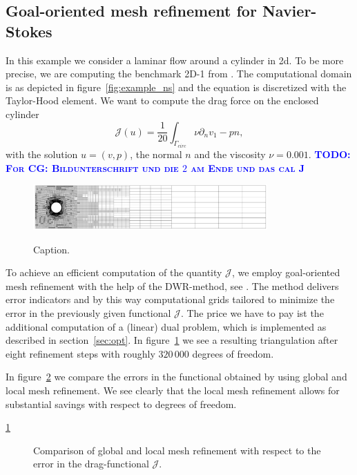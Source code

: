 \documentclass[smallextended]{svjour3}       %
\numberwithin{equation}{section}
\newcommand{\todo}[1]{\textbf{\textsc{\textcolor{blue}{TODO: #1}}}}
\begin{document}
\subsection{Goal-oriented mesh refinement for Navier-Stokes}
In this example we consider a laminar flow around a cylinder in 2d. To be more precise, we are computing the benchmark 2D-1 from \cite{TuSchae96}. The computational domain is as depicted in figure~\ref{fig:example_ns} and the equation is discretized with the Taylor-Hood  element. We want to compute the drag force on the enclosed cylinder
\begin{equation}
\mathcal {J}( u) = \frac 1 {20} \int_{\Gamma_{circ}} \nu\partial_nv _1 - pn,
\end{equation}
with the solution $u = (v,p)$, the normal $n$ and the viscosity $\nu = 0.001$.
\todo{For CG: Bildunterschrift und die $2$ am Ende und 
das cal J}
\begin{figure}[hbt]
\centering
{\includegraphics[width=0.8\textwidth]{Pictures/local_grid_NS.png}}
\caption{Caption.}
\label{fig:NS_local_grid}
\end{figure}
To achieve an efficient computation of the quantity $\mathcal J$, we employ goal-oriented mesh refinement with the help of the DWR-method, see \cite{BeRa96}. The method delivers error indicators and by this way computational grids tailored to minimize the error in the previously given functional $\mathcal J$. The price we have to pay ist the additional computation of a (linear) dual problem, which is implemented as described in section~\ref{sec:opt}. In figure~\ref{fig:NS_local_grid} we see a resulting triangulation after eight refinement steps with roughly $320\,000$ degrees of freedom.

In figure~\ref{fig:NS_comparison} we compare the errors in the functional obtained by using global and local mesh refinement. We see clearly that the local mesh refinement allows for substantial savings with respect to degrees of freedom.

\ref{fig:NS_local_grid}
\begin{figure}[hbt]
\centering
\resizebox{0.5\textwidth}{!}{}
\caption{Comparison of global and local mesh refinement with respect to the error in the drag-functional $\mathcal J$.}
\label{fig:NS_comparison}
\end{figure}
\end{document}
